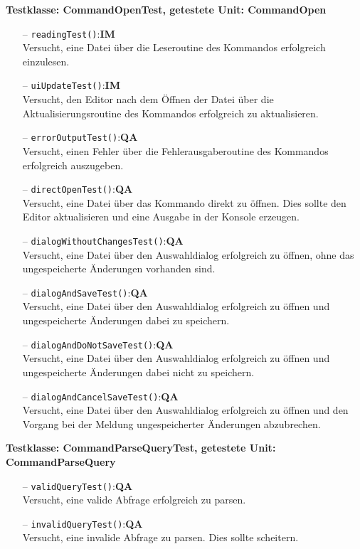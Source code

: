 \documentclass[parskip=full,11pt,twoside]{scrartcl}
\def\qa{\hfill\textbf{QA}}
\def\impl{\hfill\textbf{IM}}
\begin{document}
\textbf{Testklasse: CommandOpenTest, getestete Unit: CommandOpen}
\begin{itemize}
	\item[--] \texttt{readingTest()}:\impl\\
	Versucht, eine Datei über die Leseroutine des Kommandos erfolgreich einzulesen.
	\item[--] \texttt{uiUpdateTest()}:\impl\\
	Versucht, den Editor nach dem Öffnen der Datei über die Aktualisierungsroutine des Kommandos erfolgreich zu aktualisieren.
	\item[--] \texttt{errorOutputTest()}:\qa\\
	Versucht, einen Fehler über die Fehlerausgaberoutine des Kommandos erfolgreich auszugeben.
	\item[--] \texttt{directOpenTest()}:\qa\\
	Versucht, eine Datei über das Kommando direkt zu öffnen. Dies sollte den Editor aktualisieren und eine Ausgabe in der Konsole erzeugen.
	\item[--] \texttt{dialogWithoutChangesTest()}:\qa\\
	Versucht, eine Datei über den Auswahldialog erfolgreich zu öffnen, ohne das ungespeicherte Änderungen vorhanden sind.
	\item[--] \texttt{dialogAndSaveTest()}:\qa\\
	Versucht, eine Datei über den Auswahldialog erfolgreich zu öffnen und ungespeicherte Änderungen dabei zu speichern.
	\item[--] \texttt{dialogAndDoNotSaveTest()}:\qa\\
	Versucht, eine Datei über den Auswahldialog erfolgreich zu öffnen und ungespeicherte Änderungen dabei nicht zu speichern.
	\item[--] \texttt{dialogAndCancelSaveTest()}:\qa\\
	Versucht, eine Datei über den Auswahldialog erfolgreich zu öffnen und den Vorgang bei der Meldung ungespeicherter Änderungen abzubrechen.
\end{itemize}

\textbf{Testklasse: CommandParseQueryTest, getestete Unit: CommandParseQuery}
\begin{itemize}
	\item[--] \texttt{validQueryTest()}:\qa\\
	Versucht, eine valide Abfrage erfolgreich zu parsen.
	\item[--] \texttt{invalidQueryTest()}:\qa\\
	Versucht, eine invalide Abfrage zu parsen. Dies sollte scheitern.
\end{itemize}
\end{document}
